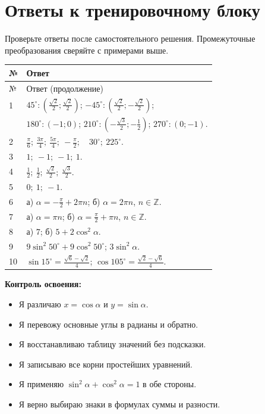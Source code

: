 \documentclass[a4paper,12pt]{article}
\newcommand{\dd}{^{\circ}}
\begin{document}
\section*{Ответы к тренировочному блоку}
\textcolor{softgray}{Проверьте ответы после самостоятельного решения. Промежуточные преобразования сверяйте с примерами выше.}
\renewcommand{\arraystretch}{1.42}
\begin{longtable}{@{}p{9mm}p{\dimexpr\linewidth-15mm\relax}@{}}
\toprule
№ & Ответ\\\midrule\endfirsthead
\toprule № & Ответ (продолжение)\\\midrule\endhead
1 & $45\dd:\left(\frac{\sqrt2}{2};\frac{\sqrt2}{2}\right)$; $-45\dd:\left(\frac{\sqrt2}{2};-\frac{\sqrt2}{2}\right)$;\\
  & $180\dd:(-1;0)$; $210\dd:\left(-\frac{\sqrt3}{2};-\frac12\right)$; $270\dd:(0;-1)$.\\[3pt]
2 & $\frac\pi6;\ \frac{3\pi}{4};\ \frac{5\pi}{4};\ -\frac\pi2;\quad 30\dd;\ 225\dd$.\\[3pt]
3 & $1;\ -1;\ -1;\ 1$.\\[3pt]
4 & $\frac12;\ \frac12;\ \frac{\sqrt2}{2};\ \frac{\sqrt3}{2}$.\\[3pt]
5 & $0;\ 1;\ -1$.\\[3pt]
6 & а) $\displaystyle\alpha=-\frac\pi2+2\pi n$; \quad б) $\alpha=2\pi n$, $n\in\mathbb Z$.\\[3pt]
7 & а) $\alpha=\pi n$; \quad б) $\displaystyle\alpha=\frac\pi2+\pi n$, $n\in\mathbb Z$.\\[3pt]
8 & а) $7$; \quad б) $5+2\cos^2\alpha$.\\[3pt]
9 & $9\sin^2 50\dd+9\cos^2 50\dd$; \quad $3\sin^2\alpha$.\\[3pt]
10 & $\displaystyle\sin15\dd=\frac{\sqrt6-\sqrt2}{4}$; \quad $\displaystyle\cos105\dd=\frac{\sqrt2-\sqrt6}{4}$.\\
\bottomrule
\end{longtable}
\vspace{9mm}
\textcolor{darkaccent}{\textbf{Контроль освоения:}}
\begin{itemize}[label=$\square$,leftmargin=*,itemsep=1pt]
\item Я различаю $x=\cos\alpha$ и $y=\sin\alpha$.
\item Я перевожу основные углы в радианы и обратно.
\item Я восстанавливаю таблицу значений без подсказки.
\item Я записываю все корни простейших уравнений.
\item Я применяю $\sin^2\alpha+\cos^2\alpha=1$ в обе стороны.
\item Я верно выбираю знаки в формулах суммы и разности.
\end{itemize}
\end{document}
